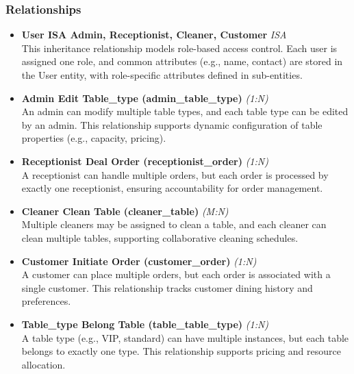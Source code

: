 \documentclass[12pt]{article}
\begin{document}
\subsubsection{Relationships}
\begin{itemize}
    \item \textbf{User ISA Admin, Receptionist, Cleaner, Customer} \hfill \textit{ISA} \\
        This inheritance relationship models role-based access control. Each user is assigned one role, and common attributes (e.g., name, contact) are stored in the User entity, with role-specific attributes defined in sub-entities.
        
    \item \textbf{Admin Edit Table\_type (admin\_table\_type)} \hfill \textit{(1:N)} \\
        An admin can modify multiple table types, and each table type can be edited by an admin. This relationship supports dynamic configuration of table properties (e.g., capacity, pricing).
        
    \item \textbf{Receptionist Deal Order (receptionist\_order)} \hfill \textit{(1:N)} \\
        A receptionist can handle multiple orders, but each order is processed by exactly one receptionist, ensuring accountability for order management.
        
    \item \textbf{Cleaner Clean Table (cleaner\_table)} \hfill \textit{(M:N)} \\
        Multiple cleaners may be assigned to clean a table, and each cleaner can clean multiple tables, supporting collaborative cleaning schedules.
        
    \item \textbf{Customer Initiate Order (customer\_order)} \hfill \textit{(1:N)} \\
        A customer can place multiple orders, but each order is associated with a single customer. This relationship tracks customer dining history and preferences.
        
    \item \textbf{Table\_type Belong Table (table\_table\_type)} \hfill \textit{(1:N)} \\
        A table type (e.g., VIP, standard) can have multiple instances, but each table belongs to exactly one type. This relationship supports pricing and resource allocation.
        

\end{itemize}
\end{document}
